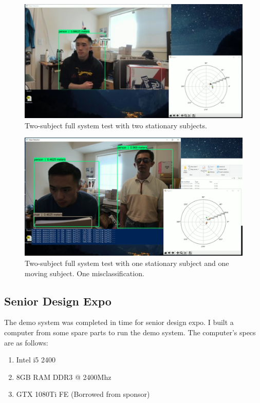 \documentclass[onecolumn, draftclsnofoot,10pt, compsoc]{IEEEtran}
\makeatletter
\newcommand\captionof[1]{\def\@captype{#1}\caption}
\makeatother
\begin{document}
\begin{singlespace}
		\begin{figure}[H]
		\includegraphics[scale=0.4]{final2.PNG}
		\captionof{figure}{Two-subject full system test with two stationary subjects.}
		\label{final2}
		\end{figure}

		\begin{figure}[H]
		\includegraphics[scale=0.4]{final1.PNG}
		\captionof{figure}{Two-subject full system test with one stationary subject and one moving subject. One misclassification.}
		\label{final1}
		\end{figure}

	\subsection{Senior Design Expo}
		The demo system was completed in time for senior design expo. 
		I built a computer from some spare parts to run the demo system.
		The computer's specs are as follows:
		

		\begin{enumerate}
		\item Intel i5 2400
		\item 8GB RAM DDR3 @ 2400Mhz
		\item GTX 1080Ti FE (Borrowed from sponsor)
		\end{enumerate}
		


\end{singlespace}
\end{document}
